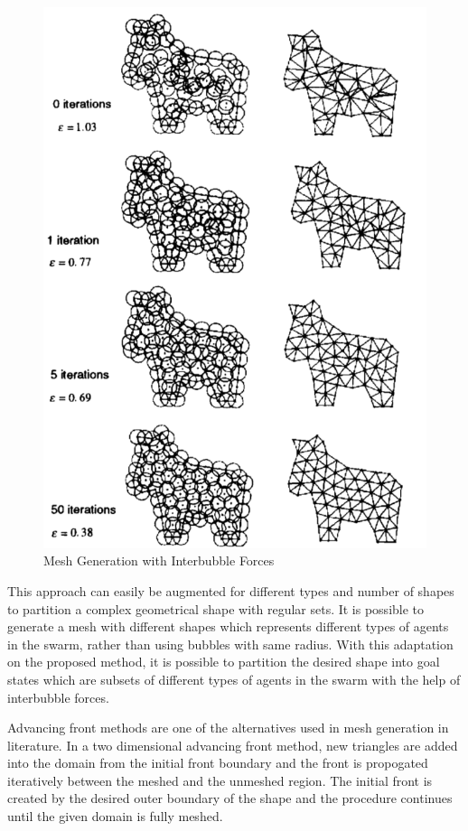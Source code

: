 \begin{figure}[H]
	\caption{Mesh Generation with Interbubble Forces \cite{27}} \label{mesh_genearation_ref}
	\centering
	\includegraphics[scale = 0.4]{interbubble2}
\end{figure}

This approach can easily be augmented for different types and number of shapes to partition a complex geometrical shape with regular sets. It is possible to generate a mesh with different shapes which represents different types of agents in the swarm, rather than using bubbles with same radius. With this adaptation on the proposed method, it is possible to partition the desired shape into goal states which are subsets of different types of agents in the swarm with the help of interbubble forces. 

Advancing front methods are one of the alternatives used in mesh generation in literature.  In a two dimensional advancing front method, new triangles are added into the domain from the initial front boundary and the front is propogated iteratively between the meshed and the unmeshed region. The initial front is created by the desired outer boundary of the shape and the procedure continues until the given domain is fully meshed. 


